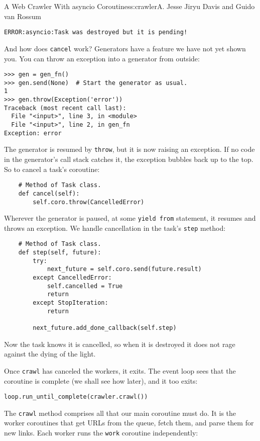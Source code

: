 \begin{aosachapter}{A Web Crawler With asyncio Coroutines}{s:crawler}{A. Jesse Jiryu Davis and Guido van Rossum}
\begin{verbatim}
ERROR:asyncio:Task was destroyed but it is pending!
\end{verbatim}

And how does \texttt{cancel} work? Generators have a feature we have not
yet shown you. You can throw an exception into a generator from outside:

\begin{verbatim}
>>> gen = gen_fn()
>>> gen.send(None)  # Start the generator as usual.
1
>>> gen.throw(Exception('error'))
Traceback (most recent call last):
  File "<input>", line 3, in <module>
  File "<input>", line 2, in gen_fn
Exception: error
\end{verbatim}

The generator is resumed by \texttt{throw}, but it is now raising an
exception. If no code in the generator's call stack catches it, the
exception bubbles back up to the top. So to cancel a task's coroutine:

\begin{verbatim}
    # Method of Task class.
    def cancel(self):
        self.coro.throw(CancelledError)
\end{verbatim}

Wherever the generator is paused, at some \texttt{yield from} statement,
it resumes and throws an exception. We handle cancellation in the task's
\texttt{step} method:

\begin{verbatim}
    # Method of Task class.
    def step(self, future):
        try:
            next_future = self.coro.send(future.result)
        except CancelledError:
            self.cancelled = True
            return
        except StopIteration:
            return

        next_future.add_done_callback(self.step)
\end{verbatim}

Now the task knows it is cancelled, so when it is destroyed it does not
rage against the dying of the light.

Once \texttt{crawl} has canceled the workers, it exits. The event loop
sees that the coroutine is complete (we shall see how later), and it too
exits:

\begin{verbatim}
loop.run_until_complete(crawler.crawl())
\end{verbatim}

The \texttt{crawl} method comprises all that our main coroutine must do.
It is the worker coroutines that get URLs from the queue, fetch them,
and parse them for new links. Each worker runs the \texttt{work}
coroutine independently:


\end{aosachapter}
